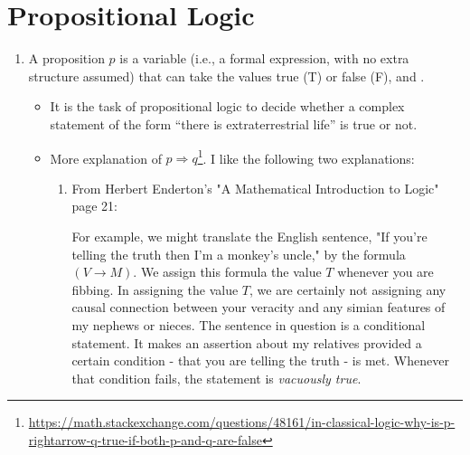 \documentclass{article}
\begin{document}
\section{Propositional Logic}
\begin{enumerate}
    \item {} A proposition $p$ is a variable (i.e., a formal expression, with no extra structure assumed)  that can take the values true (T) or false (F), and .
    \begin{itemize}
        \item It is  the task of propositional logic to decide whether a complex statement of the form “there is extraterrestrial life” is true or not.
        \item More explanation of $p\Rightarrow q$\footnote{{\tiny \url{ https://math.stackexchange.com/questions/48161/in-classical-logic-why-is-p-rightarrow-q-true-if-both-p-and-q-are-false}}}. I like the following two explanations:
        \begin{enumerate}
            \item  From Herbert Enderton's "A Mathematical Introduction to Logic" page 21:
    
For example, we might translate the English sentence, "If you're telling the truth then I'm a monkey's uncle," by the formula $(V \rightarrow M)$. We assign this formula the value $T$ whenever you are fibbing. In assigning the value $T$, we are certainly not assigning any causal connection between your veracity and any simian features of my nephews or nieces. The sentence in question is a conditional statement. It makes an assertion about my relatives provided a certain condition - that you are telling the truth - is met. Whenever that condition fails, the statement is \emph{vacuously true}.


\end{enumerate}
\end{itemize}
\end{enumerate}
\end{document}
